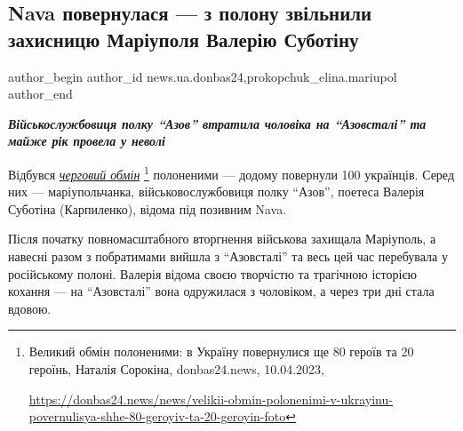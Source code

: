  
 
 
 
 
 
\subsection{Nava повернулася — з полону звільнили захисницю Маріуполя Валерію Суботіну}
\label{sec:10_04_2023.stz.news.ua.donbas24.1.nava_povernulasja}
 
\ifcmt
 author_begin
   author_id news.ua.donbas24,prokopchuk_elina.mariupol
 author_end
\fi


\begin{center}
  \em\bfseries\Large
  Військослужбовиця полку \enquote{Азов} втратила чоловіка на \enquote{Азовсталі} та майже рік провела у неволі
\end{center}

Відбувся \href{https://donbas24.news/news/velikii-obmin-polonenimi-v-ukrayinu-povernulisya-shhe-80-geroyiv-ta-20-geroyin-foto}{\emph{черговий обмін}}%
\footnote{Великий обмін полоненими: в Україну повернулися ще 80 героїв та 20 героїнь, Наталія Сорокіна, donbas24.news, 10.04.2023, \par\url{https://donbas24.news/news/velikii-obmin-polonenimi-v-ukrayinu-povernulisya-shhe-80-geroyiv-ta-20-geroyin-foto}}
полоненими — додому повернули 100 українців. Серед них — маріупольчанка,
військовослужбовиця полку \enquote{Азов}, поетеса Валерія Суботіна
(Карпиленко), відома під позивним Nava.

Після початку повномасштабного вторгнення військова захищала Маріуполь, а
навесні разом з побратимами вийшла з \enquote{Азовсталі} та весь цей час перебувала у
російському полоні. Валерія відома своєю творчістю та трагічною історією
кохання — на \enquote{Азовсталі} вона одружилася з чоловіком, а через три дні стала
вдовою.

